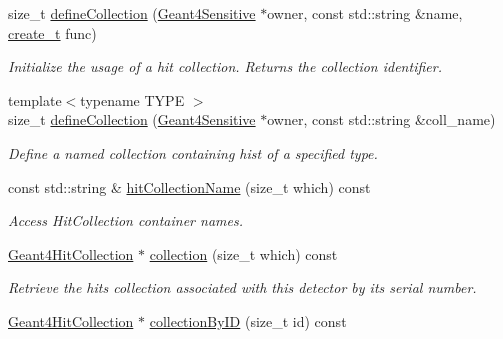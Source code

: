 \begin{DoxyCompactItemize}
size\_\-t \hyperlink{class_d_d4hep_1_1_simulation_1_1_geant4_sens_det_action_sequence_af610d10bd4b9a699b7d8b4179b0de946}{defineCollection} (\hyperlink{class_d_d4hep_1_1_simulation_1_1_geant4_sensitive}{Geant4Sensitive} $\ast$owner, const std::string \&name, \hyperlink{class_d_d4hep_1_1_simulation_1_1_geant4_sens_det_action_sequence_a81e56326a5a51cf3df62bfe60014b291}{create\_\-t} func)
\begin{DoxyCompactList}\small\item\em Initialize the usage of a hit collection. Returns the collection identifier. \item\end{DoxyCompactList}\item 
{\footnotesize template$<$typename TYPE $>$ }\\size\_\-t \hyperlink{class_d_d4hep_1_1_simulation_1_1_geant4_sens_det_action_sequence_af695ff3e1e2eee1b7a79a5d1c2a58cd5}{defineCollection} (\hyperlink{class_d_d4hep_1_1_simulation_1_1_geant4_sensitive}{Geant4Sensitive} $\ast$owner, const std::string \&coll\_\-name)
\begin{DoxyCompactList}\small\item\em Define a named collection containing hist of a specified type. \item\end{DoxyCompactList}\item 
const std::string \& \hyperlink{class_d_d4hep_1_1_simulation_1_1_geant4_sens_det_action_sequence_a6f9bd0c50d2373f56032da383468ea87}{hitCollectionName} (size\_\-t which) const 
\begin{DoxyCompactList}\small\item\em Access HitCollection container names. \item\end{DoxyCompactList}\item 
\hyperlink{class_d_d4hep_1_1_simulation_1_1_geant4_hit_collection}{Geant4HitCollection} $\ast$ \hyperlink{class_d_d4hep_1_1_simulation_1_1_geant4_sens_det_action_sequence_af50bd4353281e47a0fdf09bee888b092}{collection} (size\_\-t which) const 
\begin{DoxyCompactList}\small\item\em Retrieve the hits collection associated with this detector by its serial number. \item\end{DoxyCompactList}\item 
\hyperlink{class_d_d4hep_1_1_simulation_1_1_geant4_hit_collection}{Geant4HitCollection} $\ast$ \hyperlink{class_d_d4hep_1_1_simulation_1_1_geant4_sens_det_action_sequence_af724af407cc2823ba81803760500462c}{collectionByID} (size\_\-t id) const 

\end{DoxyCompactItemize}
